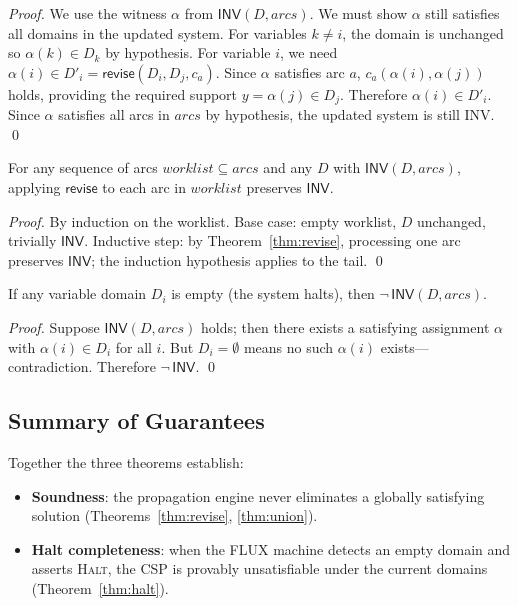 \documentclass[sigplan,10pt,review]{acmart}
\begin{document}
\begin{proof}
We use the witness $\alpha$ from $\mathsf{INV}(D, \mathit{arcs})$. We must show
$\alpha$ still satisfies all domains in the updated system. For variables $k \neq i$,
the domain is unchanged so $\alpha(k) \in D_k$ by hypothesis. For variable $i$,
we need $\alpha(i) \in D'_i = \mathsf{revise}(D_i, D_j, c_a)$. Since $\alpha$
satisfies arc $a$, $c_a(\alpha(i), \alpha(j))$ holds, providing the required support
$y = \alpha(j) \in D_j$. Therefore $\alpha(i) \in D'_i$. Since $\alpha$ satisfies
all arcs in $\mathit{arcs}$ by hypothesis, the updated system is still INV. \qed
\end{proof}

\begin{theorem}
\label{thm:union}
For any sequence of arcs $\mathit{worklist} \subseteq \mathit{arcs}$ and any $D$
with $\mathsf{INV}(D, \mathit{arcs})$, applying $\mathsf{revise}$ to each arc in
$\mathit{worklist}$ preserves $\mathsf{INV}$.
\end{theorem}

\begin{proof}
By induction on the worklist. Base case: empty worklist, $D$ unchanged, trivially
$\mathsf{INV}$. Inductive step: by Theorem~\ref{thm:revise}, processing one arc
preserves $\mathsf{INV}$; the induction hypothesis applies to the tail. \qed
\end{proof}

\begin{theorem}
\label{thm:halt}
If any variable domain $D_i$ is empty (the system halts), then
$\neg\, \mathsf{INV}(D, \mathit{arcs})$.
\end{theorem}

\begin{proof}
Suppose $\mathsf{INV}(D, \mathit{arcs})$ holds; then there exists a satisfying
assignment $\alpha$ with $\alpha(i) \in D_i$ for all $i$. But $D_i = \emptyset$
means no such $\alpha(i)$ exists---contradiction. Therefore $\neg\, \mathsf{INV}$. \qed
\end{proof}

\subsection{Summary of Guarantees}

Together the three theorems establish:
\begin{itemize}
  \item \textbf{Soundness}: the propagation engine never eliminates a globally satisfying
    solution (Theorems~\ref{thm:revise}, \ref{thm:union}).
  \item \textbf{Halt completeness}: when the FLUX machine detects an empty domain and
    asserts \textsc{Halt}, the CSP is provably unsatisfiable under the current domains
    (Theorem~\ref{thm:halt}).
\end{itemize}
\end{document}
